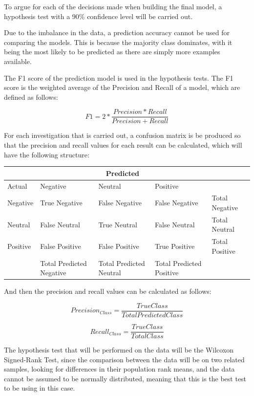 To argue for each of the decisions made when building the final model, a hypothesis test with a 90\% confidence level will be carried out.

Due to the imbalance in the data, a prediction accuracy cannot be used for comparing the models. This is because the majority class dominates, with it being the most likely to be predicted as there are simply more examples available. \cite{al2015applied} 

The F1 score of the prediction model is used in the hypothesis tests. The F1 score is the weighted average of the Precision and Recall of a model, which are defined as follows: 

$$ F1 = 2 * \frac{Precision * Recall}{Precision + Recall} $$

For each investigation that is carried out, a confusion matrix is be produced so that the precision and recall values for each result can be calculated, which will have the following structure: 

\begin{center}
\begin{tabular}{ |p{3cm}|p{3cm}|p{3cm}|p{3cm}|p{3cm}| }
 \hline
  & \multicolumn{3}{|c|}{Predicted} &\\
 \hline
   Actual & Negative & Neutral & Positive &\\
    \hline
    Negative &  True Negative   &  False Negative  & False Negative & Total Negative\\
    Neutral & False Neutral & True Neutral&  False Neutral & Total Neutral \\
    Positive & False Positive & False Positive &  True Positive & Total Positive\\
    \hline
    & Total Predicted Negative & Total Predicted Neutral & Total Predicted Positive & \\
 \hline
\end{tabular}

\end{center}

And then the precision and recall values can be calculated as follows:

$$ Precision_{Class} = \frac{True Class}{Total Predicted Class} $$

$$ Recall_{Class} = \frac{True Class}{Total Class} $$



The hypothesis test that will be performed on the data will be the Wilcoxon Signed-Rank Test, since the comparison between the data will be on two related samples, looking for differences in their population rank means, and the data cannot be assumed to be normally distributed, meaning that this is the best test to be using in this case. \cite{wilcoxon1970critical}



